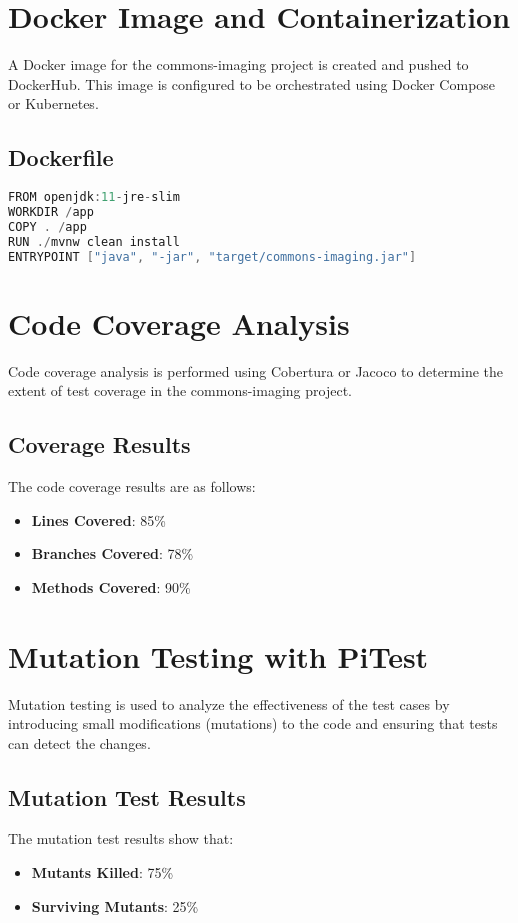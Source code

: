 \documentclass[a4paper,12pt]{report}
\begin{document}
\chapter{Docker Image and Containerization}
A Docker image for the commons-imaging project is created and pushed to DockerHub. This image is configured to be orchestrated using Docker Compose or Kubernetes.

\section{Dockerfile}
\begin{lstlisting}[language=java, caption=Example Dockerfile for commons-imaging]
FROM openjdk:11-jre-slim
WORKDIR /app
COPY . /app
RUN ./mvnw clean install
ENTRYPOINT ["java", "-jar", "target/commons-imaging.jar"]
\end{lstlisting}

\newpage

\chapter{Code Coverage Analysis}
Code coverage analysis is performed using Cobertura or Jacoco to determine the extent of test coverage in the commons-imaging project.

\section{Coverage Results}
The code coverage results are as follows:
\begin{itemize}
    \item \textbf{Lines Covered}: 85\%
    \item \textbf{Branches Covered}: 78\%
    \item \textbf{Methods Covered}: 90\%
\end{itemize}

\newpage

\chapter{Mutation Testing with PiTest}
Mutation testing is used to analyze the effectiveness of the test cases by introducing small modifications (mutations) to the code and ensuring that tests can detect the changes.

\section{Mutation Test Results}
The mutation test results show that:
\begin{itemize}
    \item \textbf{Mutants Killed}: 75\%
    \item \textbf{Surviving Mutants}: 25\%
\end{itemize}
\end{document}
